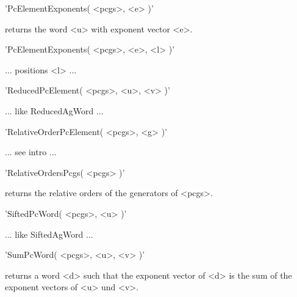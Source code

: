 
'PcElementExponents( <pcgs>, <e> )'

returns the word <u> with exponent vector <e>.

'PcElementExponents( <pcgs>, <e>, <l> )'

... positions <l> ...


'ReducedPcElement( <pcgs>, <u>, <v> )'

... like ReducedAgWord ...


'RelativeOrderPcElement( <pcgs>, <g> )'

... see intro ...


'RelativeOrdersPcgs( <pcgs> )'

returns the relative orders of the generators of <pcgs>.


'SiftedPcWord( <pcgs>, <u> )'

... like SiftedAgWord ...


'SumPcWord( <pcgs>, <u>, <v> )'

returns a word <d> such that the exponent vector of <d> is the sum of the
exponent vectors of <u> und <v>.
